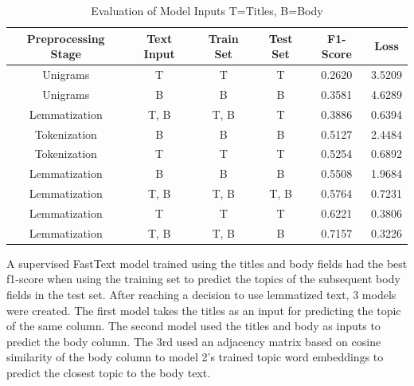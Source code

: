 \documentclass[11pt]{article}
\begin{document}
\pagebreak

\begin{table}[h]
\centering
\begin{tabular}{ c | c | c | c | c | c}
  \hline
  Preprocessing Stage & Text Input & Train Set & Test Set & F1-Score & Loss \\
  \hline    
  Unigrams & T & T & T & 0.2620 & 3.5209 \\
  Unigrams &  B & B & B & 0.3581 & 4.6289 \\   
  Lemmatization & T, B & T, B & T & 0.3886 & 0.6394 \\
  Tokenization & B & B & B & 0.5127 & 2.4484 \\                
  Tokenization & T & T & T & 0.5254 & 0.6892 \\
  Lemmatization & B & B & B & 0.5508 & 1.9684 \\
  Lemmatization & T, B & T, B & T, B & 0.5764 & 0.7231 \\
  Lemmatization & T & T & T & 0.6221 & 0.3806 \\
  Lemmatization & T, B & T, B & B & 0.7157 & 0.3226 \\


  \hline  
\end{tabular}
\caption{Evaluation of Model Inputs T=Titles, B=Body}
\label{tbl:preprocessing}
\end{table}

A supervised FastText model trained using the titles and body fields had the best f1-score when using the training set to predict the topics of the subsequent body fields in the test set.  After reaching a decision to use lemmatized text, 3 models were created.  The first model takes the titles as an input for predicting the topic of the same column. The second model used the titles and body as inputs to predict the body column. The 3rd used an adjacency matrix based on cosine similarity of the body column to model 2's trained topic word embeddings to predict the closest topic to the body text. 

\vspace{5 mm}
\end{document}
